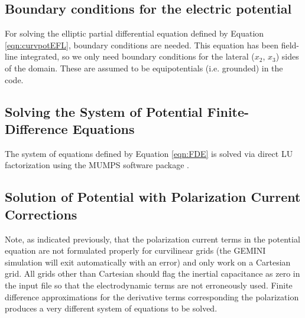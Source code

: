 \documentclass[11pt,letterpaper]{article}
\begin{document}
\subsection{Boundary conditions for the electric potential}

For solving the elliptic partial differential equation defined by Equation \ref{eqn:curvpotEFL}, boundary conditions are needed.  This equation has been field-line integrated, so we only need boundary conditions for the lateral ($x_2$, $x_3$) sides of the domain.  These are assumed to be equipotentials (i.e. grounded) in the code.  


\subsection{Solving the System of Potential Finite-Difference Equations}

The system of equations defined by Equation \ref{eqn:FDE} is solved via direct LU factorization using the MUMPS software package \citep{Amestoy:2001,Amestoy:2006}.


\subsection{Solution of Potential with Polarization Current Corrections}

Note, as indicated previously, that the polarization current terms in the potential equation are not formulated properly for curvilinear grids (the GEMINI simulation will exit automatically with an error) and only work on a Cartesian grid.  All grids other than Cartesian should flag the inertial capacitance as zero in the input file so that the electrodynamic terms are not erroneously used.  Finite difference approximations for the derivative terms corresponding the polarization produces a very different system of equations to be solved.  
\end{document}
